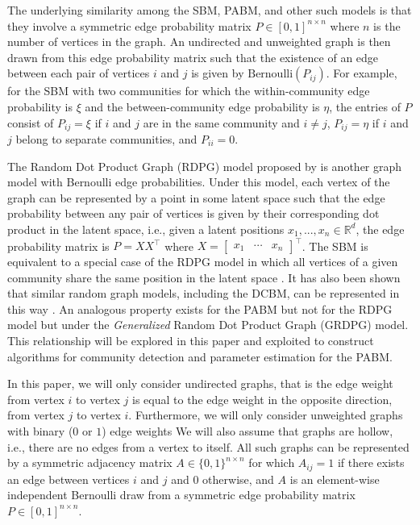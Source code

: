 \documentclass[12pt]{article}
\begin{document}
The underlying similarity among the SBM, PABM, and other such models is
that they involve a symmetric edge probability matrix
\(P \in [0, 1]^{n \times n}\) where \(n\) is the number of vertices in
the graph. An undirected and unweighted graph is then drawn from this
edge probability matrix such that the existence of an edge between each
pair of vertices \(i\) and \(j\) is given by
\(\text{Bernoulli}(P_{ij})\). For example, for the SBM with two
communities for which the within-community edge probability is \(\xi\)
and the between-community edge probability is \(\eta\), the entries of
\(P\) consist of \(P_{ij} = \xi\) if \(i\) and \(j\) are in the same
community and \(i \neq j\), \(P_{ij} = \eta\) if \(i\) and \(j\) belong
to separate communities, and \(P_{ii} = 0\).

The Random Dot Product Graph (RDPG) model proposed by
\citet*{10.1007/978-3-540-77004-6_11} is another graph model with
Bernoulli edge probabilities. Under this model, each vertex of the graph
can be represented by a point in some latent space such that the edge
probability between any pair of vertices is given by their corresponding
dot product in the latent space, i.e., given a latent positions
\(x_1, ..., x_n \in \mathbb{R}^d\), the edge probability matrix is
\(P = X X^\top\) where
\(X = \begin{bmatrix} x_1 & \cdots & x_n \end{bmatrix}^\top\). The SBM
is equivalent to a special case of the RDPG model in which all vertices
of a given community share the same position in the latent space
\cite{lyzinski2014}. It has also been shown that similar random graph
models, including the DCBM, can be represented in this way
\cite{lyzinski2014} \cite{rubindelanchy2017consistency}. An analogous
property exists for the PABM but not for the RDPG model but under the
\emph{Generalized} Random Dot Product Graph (GRDPG) model. This
relationship will be explored in this paper and exploited to construct
algorithms for community detection and parameter estimation for the
PABM.

In this paper, we will only consider undirected graphs, that is the edge
weight from vertex \(i\) to vertex \(j\) is equal to the edge weight in
the opposite direction, from vertex \(j\) to vertex \(i\). Furthermore,
we will only consider unweighted graphs with binary (\(0\) or \(1\))
edge weights We will also assume that graphs are hollow, i.e., there are
no edges from a vertex to itself. All such graphs can be represented by
a symmetric adjacency matrix \(A \in \{0, 1\}^{n \times n}\) for which
\(A_{ij} = 1\) if there exists an edge between vertices \(i\) and \(j\)
and \(0\) otherwise, and \(A\) is an element-wise independent Bernoulli
draw from a symmetric edge probability matrix
\(P \in [0, 1]^{n \times n}\).
\end{document}
